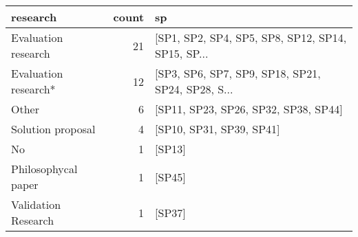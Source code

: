 \begin{tabular}{lrl}
\toprule
             research &  count &                                                 sp \\
\midrule
  Evaluation research &     21 &  [SP1, SP2, SP4, SP5, SP8, SP12, SP14, SP15, SP... \\
 Evaluation research* &     12 &  [SP3, SP6, SP7, SP9, SP18, SP21, SP24, SP28, S... \\
                Other &      6 &               [SP11, SP23, SP26, SP32, SP38, SP44] \\
    Solution proposal &      4 &                           [SP10, SP31, SP39, SP41] \\
                   No &      1 &                                             [SP13] \\
  Philosophycal paper &      1 &                                             [SP45] \\
  Validation Research &      1 &                                             [SP37] \\
\bottomrule
\end{tabular}
